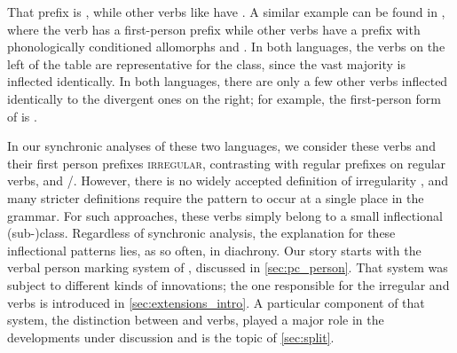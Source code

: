 That prefix is , while other  verbs like  have .
A similar example can be found in \trio, where the verb  has a first-person prefix  while other  verbs have a prefix with phonologically conditioned allomorphs  and  .
In both languages, the verbs on the left of the table are representative for the  class, since the vast majority is inflected identically.
In both languages, there are only a few other verbs inflected identically to the divergent ones on the right; for example, the first-person form of \trio {} is  \parencites[339]{triomeira1999}.

In our synchronic analyses of these two languages, we consider these verbs and their first person prefixes \textsc{irregular}, contrasting with regular prefixes on regular  verbs,  and /.
However, there is no widely accepted definition of irregularity \parencite{stolz2012introduction}, and many stricter definitions \parencite[][e.g.]{haspelmath2010understanding} require the pattern to occur at a single place in the grammar.
For such approaches, these verbs simply belong to a small inflectional (sub-)class. %
Regardless of synchronic analysis, the explanation for these inflectional patterns lies, as so often, in diachrony.
Our story starts with the verbal person marking system of \PC, discussed in \cref{sec:pc_person}.
That system was subject to different kinds of innovations; the one responsible for the irregular \hixka and \trio verbs is introduced in \cref{sec:extensions_intro}.
A particular component of that system, the distinction between  and  verbs, played a major role in the developments under discussion and is the topic of \cref{sec:split}.

%

